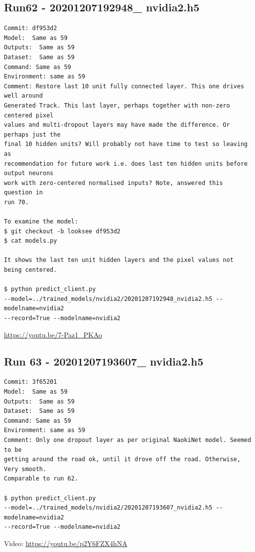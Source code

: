 \subsection{Run62 - 20201207192948\_ nvidia2.h5}
\label{app_res:62}
\begin{verbatim}
Commit: df953d2
Model:  Same as 59
Outputs:  Same as 59
Dataset:  Same as 59
Command: Same as 59
Environment: same as 59
Comment: Restore last 10 unit fully connected layer. This one drives well around 
Generated Track. This last layer, perhaps together with non-zero centered pixel 
values and multi-dropout layers may have made the difference. Or perhaps just the 
final 10 hidden units? Will probably not have time to test so leaving as 
recommendation for future work i.e. does last ten hidden units before output neurons 
work with zero-centered normalised inputs? Note, answered this question in 
run 70.

To examine the model:
$ git checkout -b looksee df953d2
$ cat models.py

It shows the last ten unit hidden layers and the pixel values not being centered.

$ python predict_client.py 
--model=../trained_models/nvidia2/20201207192948_nvidia2.h5 --modelname=nvidia2 
--record=True --modelname=nvidia2
\end{verbatim}
\url{https://youtu.be/7-Paz1_PKAo}

\subsection{Run 63 - 20201207193607\_ nvidia2.h5}
\label{app_res:63}
\begin{verbatim}
Commit: 3f65201
Model:  Same as 59
Outputs:  Same as 59
Dataset:  Same as 59
Command: Same as 59
Environment: same as 59 
Comment: Only one dropout layer as per original NaokiNet model. Seemed to be
getting around the road ok, until it drove off the road. Otherwise, Very smooth.
Comparable to run 62.

$ python predict_client.py 
--model=../trained_models/nvidia2/20201207193607_nvidia2.h5 --modelname=nvidia2 
--record=True --modelname=nvidia2

\end{verbatim}
Video: \url{https://youtu.be/p2Y6FZX4hNA}

